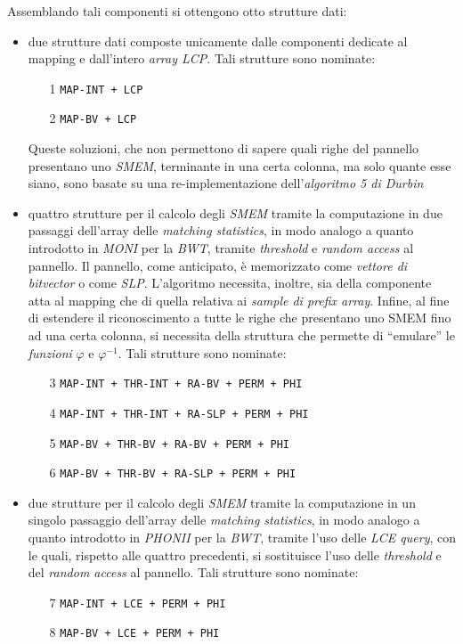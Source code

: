 Assemblando tali componenti si ottengono otto strutture dati:
\begin{itemize}
  \item due strutture dati composte unicamente dalle componenti dedicate al
  mapping e dall'intero \textit{array LCP}. Tali strutture sono nominate:
  \begin{enumerate}
    \item[1] \texttt{MAP-INT + LCP}
    \item[2] \texttt{MAP-BV + LCP}
  \end{enumerate}
  Queste soluzioni, che non permettono di sapere quali righe del pannello
  presentano uno \textit{SMEM}, terminante in una certa colonna, ma solo quante
  esse siano, sono basate su una re-implementazione dell'\textit{algoritmo 5 di
    Durbin}
  \item quattro strutture per il calcolo degli \textit{SMEM} tramite la
  computazione 
  in due passaggi dell'array delle \textit{matching statistics}, in modo analogo
  a quanto introdotto in \textit{MONI} per la \textit{BWT}, tramite
  \textit{threshold} e \textit{random access} al pannello. Il pannello, come
  anticipato, è memorizzato come \textit{vettore di bitvector} o come
  \textit{SLP}. L'algoritmo  
  necessita, inoltre, sia della componente atta al mapping che di quella
  relativa ai \textit{sample di prefix array}. Infine, al fine di estendere il
  riconoscimento a tutte le righe che presentano uno SMEM fino ad una certa
  colonna, si necessita della struttura che permette di ``emulare'' le
  \textit{funzioni} $\varphi$ e $\varphi^{-1}$. Tali strutture sono nominate:
  \begin{enumerate}
    \item[3] \texttt{MAP-INT + THR-INT + RA-BV + PERM + PHI}
    \item[4] \texttt{MAP-INT + THR-INT + RA-SLP + PERM + PHI}
    \item[5] \texttt{MAP-BV + THR-BV + RA-BV + PERM + PHI}
    \item[6] \texttt{MAP-BV + THR-BV + RA-SLP + PERM + PHI}
  \end{enumerate}
  \item due strutture per il calcolo degli \textit{SMEM} tramite la
  computazione 
  in un singolo passaggio dell'array delle \textit{matching statistics}, in modo
  analogo a quanto introdotto in \textit{PHONII} per la \textit{BWT}, tramite
  l'uso delle \textit{LCE query}, con le quali, rispetto alle quattro
  precedenti, si sostituisce l'uso delle \textit{threshold} e del \textit{random
    access} al pannello. Tali strutture sono nominate:
  \begin{enumerate}
    \item[7] \texttt{MAP-INT + LCE + PERM + PHI}
    \item[8] \texttt{MAP-BV + LCE + PERM + PHI}
  \end{enumerate}
\end{itemize}
